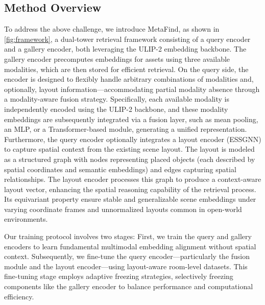 \subsection{Method Overview}
To address the above challenge, we introduce MetaFind, as shown in \ref{fig:framework}, a dual-tower retrieval framework consisting of a query encoder and a gallery encoder, both leveraging the ULIP-2 embedding backbone. The gallery encoder precomputes embeddings for assets using three available modalities, which are then stored for efficient retrieval. On the query side, the encoder is designed to flexibly handle arbitrary combinations of modalities and, optionally, layout information—accommodating partial modality absence through a modality-aware fusion strategy. Specifically, each available modality is independently encoded using the ULIP-2 backbone, and these modality embeddings are subsequently integrated via a fusion layer, such as mean pooling, an MLP, or a Transformer-based module, generating a unified representation. Furthermore, the query encoder optionally integrates a layout encoder (ESSGNN) to capture spatial context from the existing scene layout. The layout is modeled as a structured graph with nodes representing placed objects (each described by spatial coordinates and semantic embeddings) and edges capturing spatial relationships. The layout encoder processes this graph to produce a context-aware layout vector, enhancing the spatial reasoning capability of the retrieval process. Its equivariant property ensure stable and generalizable scene embeddings under varying coordinate frames and unnormalized layouts common in open-world environments. 

Our training protocol involves two stages: First, we train the query and gallery encoders to learn fundamental multimodal embedding alignment without spatial context. Subsequently, we fine-tune the query encoder—particularly the fusion module and the layout encoder—using layout-aware room-level datasets. This fine-tuning stage employs adaptive freezing strategies, selectively freezing components like the gallery encoder to balance performance and computational efficiency.
